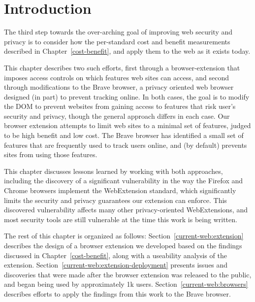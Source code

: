\section{Introduction}
\label{current-web:current-web}

The third step towards the over-arching goal of improving web security and
privacy is to consider how the per-standard cost and benefit measurements
described in Chapter~\ref{cost-benefit}, and apply them to the web as it
exists today.

This chapter describes two such efforts, first through
a browser-extension that imposes access controls on which \WAPI features
web sites can access, and second through modifications to the Brave browser,
a privacy oriented web browser designed (in part) to prevent tracking online.
In both cases, the goal is to modify the DOM to prevent websites from gaining
access to features that risk user's security and privacy, though the general
approach differs in each case. Our browser extension attempts to limit web
sites to a minimal set of features, judged to be high benefit and low cost.
The Brave browser has identified a small set of \WAPI features that
are frequently used to track users online, and (by default) prevents sites
from using those features.

This chapter discusses lessons learned by working with both approaches, including
the discovery of a significant vulnerability in the way the Firefox and Chrome
browsers implement the WebExtension standard, which significantly limits
the security and privacy guarantees our extension can enforce.  This discovered
vulnerability affects many other privacy-oriented WebExtensions, and most
security tools are still vulnerable at the time this work is being written.

The rest of this chapter is organized as follows:  Section~\ref{current-web:extension}
describes the design of a browser extension we developed based on the findings
discussed in Chapter~\ref{cost-benefit}, along with a useability analysis of
the extension.  Section~\ref{current-web:extension-deployment} presents
issues and discoveries that were made after the browser extension was released
to the public, and began being used by approximately 1k users.
Section~\ref{current-web:browsers} describes efforts to apply the findings from
this work to the Brave browser.